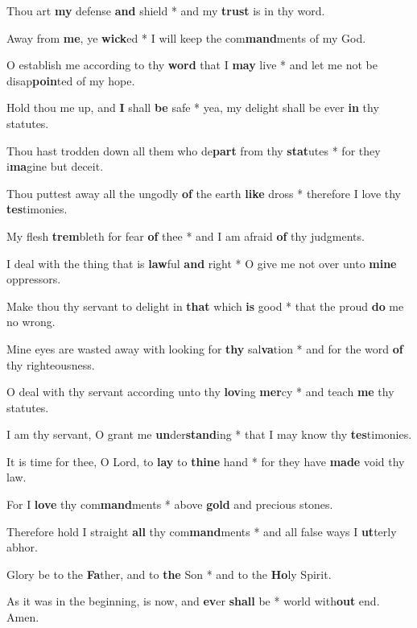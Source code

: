 \begin{multicols}{2}
	Thou art \textbf{my} defense \textbf{and} shield * and my \textbf{trust} is in thy word.
	
	Away from \textbf{me}, ye \textbf{wick}ed * I will keep the com\textbf{mand}ments of my God.
	
	O establish me according to thy \textbf{word} that I \textbf{may} live * and let me not be disap\textbf{poin}ted of my hope.
	
	Hold thou me up, and \textbf{I} shall \textbf{be} safe * yea, my delight shall be ever \textbf{in} thy statutes.
	
	Thou hast trodden down all them who de\textbf{part} from thy \textbf{stat}utes * for they i\textbf{ma}gine but deceit.
	
	Thou puttest away all the ungodly \textbf{of} the earth \textbf{like} dross * therefore I love thy \textbf{tes}timonies.
	
	My flesh \textbf{trem}bleth for fear \textbf{of} thee * and I am afraid \textbf{of} thy judgments.
	
	I deal with the thing that is \textbf{law}ful \textbf{and} right * O give me not over unto \textbf{mine} oppressors.
	
	Make thou thy servant to delight in \textbf{that} which \textbf{is} good * that the proud \textbf{do} me no wrong.
	
	Mine eyes are wasted away with looking for \textbf{thy} sal\textbf{va}tion * and for the word \textbf{of} thy righteousness.
	
	O deal with thy servant according unto thy \textbf{lov}ing \textbf{mer}cy * and teach \textbf{me} thy statutes.
	
	I am thy servant, O grant me \textbf{un}der\textbf{stand}ing * that I may know thy \textbf{tes}timonies.
	
	It is time for thee, O Lord, to \textbf{lay} to \textbf{thine} hand * for they have \textbf{made} void thy law.
	
	For I \textbf{love} thy com\textbf{mand}ments * above \textbf{gold} and precious stones.
	
	Therefore hold I straight \textbf{all} thy com\textbf{mand}ments * and all false ways I \textbf{ut}terly abhor.
	
	Glory be to the \textbf{Fa}ther, and to \textbf{the} Son * and to the \textbf{Ho}ly Spirit.
	
	As it was in the beginning, is now, and \textbf{ev}er \textbf{shall} be * world with\textbf{out} end. Amen.
\end{multicols}